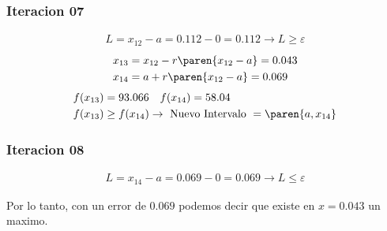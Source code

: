 \begin{homeworkProblem}
\subsubsection{Iteracion 07}
\begin{align*}
    L=x_{12}-a=0.112-0=0.112\rightarrow L \geq \varepsilon
\end{align*}
\begin{align*}
    &x_{13}=x_{12} - r\paren{x_{12}-a}= 0.043\\
    &x_{14}=a + r\paren{x_{12}-a}= 0.069
\end{align*}
\begin{align*}
    &f(x_{13})=93.066 \quad f(x_{14})=58.04 \\
    &f(x_{13}) \geq f(x_{14}) \rightarrow \text{ Nuevo Intervalo } = \paren{a,x_{14}}
\end{align*}

\subsubsection{Iteracion 08}
\begin{align*}
    L=x_{14}-a=0.069-0=0.069\rightarrow L \leq \varepsilon
\end{align*}

Por lo tanto, con un error de $0.069$ podemos decir que existe en $x=0.043$ un maximo.

\end{homeworkProblem}